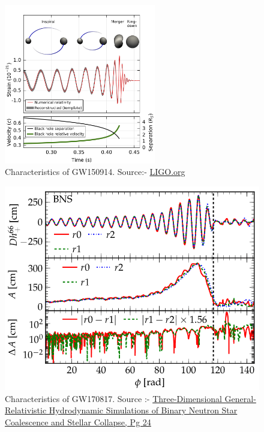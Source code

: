 \begin{figure}[h]
    \centering
    \includegraphics[height = 7cm, width = 8.2 cm]{images.tex/GW150914.png}
    \caption{Characteristics of GW150914. Source:- \href{https://www.ligo.org/science/Publication-GW150914/}{LIGO.org}}
\end{figure}

\begin{figure}[h]
     \centering
     \includegraphics[scale = 0.31]{images.tex/GW170817.png}
     \caption{Characteristics of GW170817. Source :- \href{https://www.researchgate.net/publication/233846764}{Three-Dimensional General-Relativistic Hydrodynamic Simulations of Binary Neutron Star Coalescence and Stellar Collapse, Pg 24}}
\end{figure}

\pagebreak
